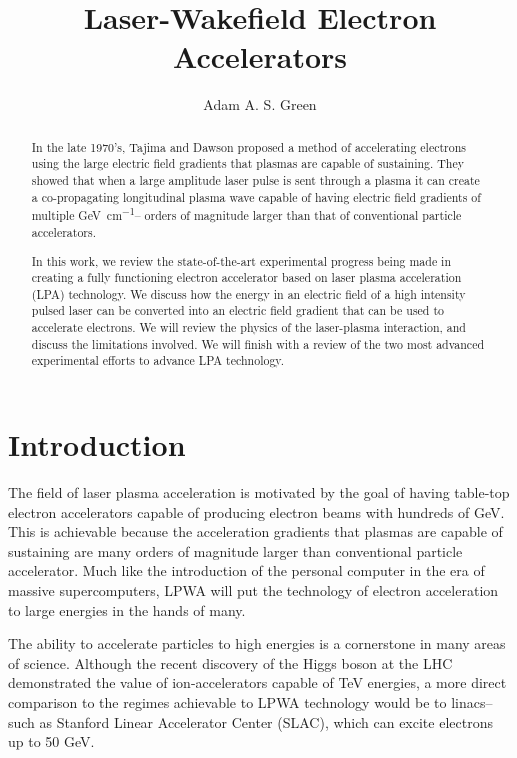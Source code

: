 \documentclass[12pt,letter]{article}
\title{Laser-Wakefield Electron Accelerators}
\author{Adam A. S. Green}
\begin{document}

\maketitle
\doublespacing
\strictpagecheck

\begin{abstract}
In the late 1970's, Tajima and Dawson proposed a method of accelerating 
electrons using the large electric field gradients that plasmas are capable of 
sustaining. They showed that when a large amplitude laser pulse is sent through 
a plasma it can create a co-propagating longitudinal plasma wave 
capable of having electric field gradients of multiple
\si{\giga\electronvolt\per\centi\meter}-- orders
of magnitude larger than that of conventional particle accelerators.

In this work, we review the state-of-the-art experimental progress being made 
in creating a fully functioning electron accelerator based on laser plasma 
acceleration (LPA) technology. We discuss how the energy in an 
 electric field of a high intensity pulsed laser can be converted 
into an electric field gradient that can be used to accelerate electrons. 
We will review the physics of the laser-plasma interaction, and discuss the
limitations involved. We will finish with a review of the two most advanced
experimental efforts to advance LPA technology.  \end{abstract}
\tableofcontents
\section{Introduction}
\label{sec:intro}
The field of laser plasma acceleration is motivated by the goal of having
table-top electron accelerators capable of producing electron beams with
hundreds of \si{\giga\electronvolt}. This is achievable because the acceleration gradients that plasmas are capable of
sustaining are many orders of magnitude larger than conventional particle
accelerator. Much like the introduction of the personal computer in the era of massive
supercomputers, LPWA will put the technology of electron acceleration to
large energies in the hands of many.

 
 
 The ability to accelerate particles to high energies is a cornerstone
 in many areas of science. Although the recent discovery of the Higgs
 boson\cite{atlas} at the LHC demonstrated the value of ion-accelerators capable of
 TeV energies, a more direct comparison to the regimes achievable to LPWA
 technology would be to linacs-- such as Stanford Linear Accelerator Center
 (SLAC), which can excite electrons up to 50 \si{\giga\electronvolt}.
\end{document}
